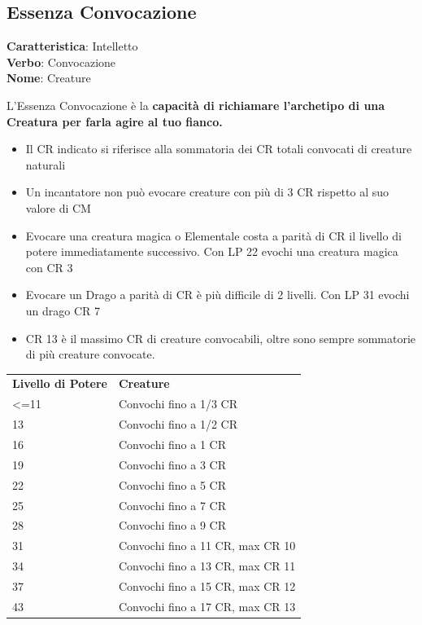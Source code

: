 \documentclass[a4paper,11pt,twoside,openany]{book}
\begin{document}
\pagebreak

\subsection{Essenza Convocazione}

\textbf{Caratteristica}: Intelletto\\
\textbf{Verbo}: Convocazione\\
\textbf{Nome}: Creature\\

\label{essenza-convocazione---intelletto}

L'Essenza Convocazione è la \textbf{capacità di richiamare l'archetipo di una Creatura per farla agire al tuo fianco.}
\begin{itemize}
	\item
      Il CR indicato si riferisce alla sommatoria dei CR totali convocati di creature naturali
	\item
      Un incantatore non può evocare creature con più di 3 CR rispetto al suo valore di CM
	\item
      Evocare una creatura magica o Elementale costa a parità di CR il livello di potere immediatamente successivo. Con LP 22 evochi una creatura magica con CR 3
	\item
      Evocare un Drago a parità di CR è più difficile di 2 livelli. Con LP 31 evochi un drago CR 7
	\item
      CR 13 è il massimo CR di creature convocabili, oltre sono sempre sommatorie di più creature convocate.
\end{itemize}

\bigskip

\begin{tabular}{L{3.5cm} L{6cm}}
	\toprule
	\textbf{Livello di Potere} & \textbf{Creature}\\
	\textless=11               & Convochi fino a 1/3 CR\\
	13                         & Convochi fino a 1/2 CR\\
	16                         & Convochi fino a 1 CR\\
	19                         & Convochi fino a 3 CR\\
	22                         & Convochi fino a 5 CR\\
	25                         & Convochi fino a 7 CR\\
	28                         & Convochi fino a 9 CR\\
	31                         & Convochi fino a 11 CR, max CR 10\\
	34                         & Convochi fino a 13 CR, max CR 11\\
	37                         & Convochi fino a 15 CR, max CR 12\\
	43                         & Convochi fino a 17 CR, max CR 13\\
\end{tabular}
\end{document}
